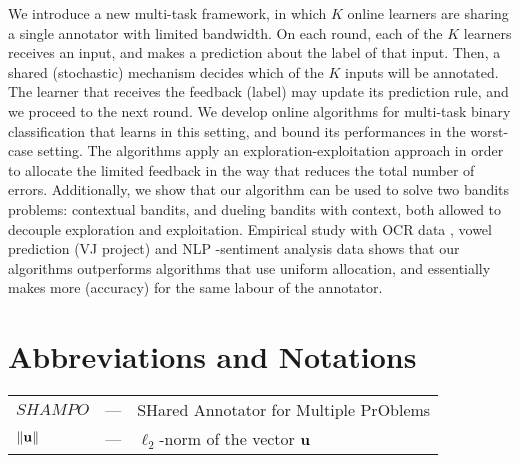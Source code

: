 \documentclass[MSc,beforeExam]{iitcsthesis}
\begin{document}






\maketitleEnglish

\abstractEnglish
We introduce a new multi-task framework, in which $K$ online
learners are sharing a single annotator with limited bandwidth. On
each round, each of the $K$ learners receives an input, and makes a
prediction about the label of that input. Then, a shared
(stochastic) mechanism decides which of the $K$ inputs will be
annotated. The learner that receives the feedback (label) may update
its prediction rule, and we proceed to the next round. We develop 
online algorithms for multi-task binary classification that learns in
this setting, and bound its performances in the worst-case
setting. The algorithms apply an exploration-exploitation approach in order to allocate the limited feedback in the way that reduces the total number of errors.  
Additionally, we show that our algorithm can be used to
solve two bandits problems: contextual bandits, and dueling bandits
with context, both allowed to decouple exploration and
exploitation. Empirical study with OCR data , vowel prediction (VJ
project) and NLP -sentiment analysis data shows that our algorithms outperforms algorithms that use
uniform allocation, and essentially makes more (accuracy) for the
same labour of the annotator.


\chapter*{Abbreviations and Notations}
\begin{tabular}{lcl}
$SHAMPO$ & --- & SHared Annotator for Multiple PrOblems\\
$\Vert\mathbf{u} \Vert$ & --- & $\ell_2$-norm of the vector $\mathbf{u}$\\
\end{tabular}
\end{document}

